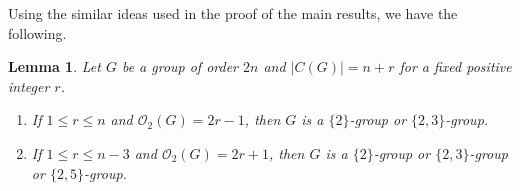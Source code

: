 \documentclass[a4paper,11pt]{amsart}
\numberwithin{equation}{section}
\numberwithin{equation}{subsection}
\newtheorem{lemma}[theorem]{Lemma}
\begin{document}
Using the similar ideas used in the proof of the main results, we have the following. 
\begin{lemma}
     Let $G$ be a group of order $2n$ and $|C(G)|=n+r$ for a fixed positive integer $r$.
     \begin{enumerate}
         \item If  $1\leq  r\leq n $ and $\mathcal{O}_{2}(G)=2r-1$,  then $G$ is a $\{2\}$-group or $\{2,3\}$-group. 
         \item If $1\leq r\leq n -3 $ and $\mathcal{O}_{2}(G)=2r+1$, then $G$ is a $\{2\}$-group or $\{2,3\}$-group or $\{2,5\}$-group.
     \end{enumerate}
      \end{lemma}






\end{document}
